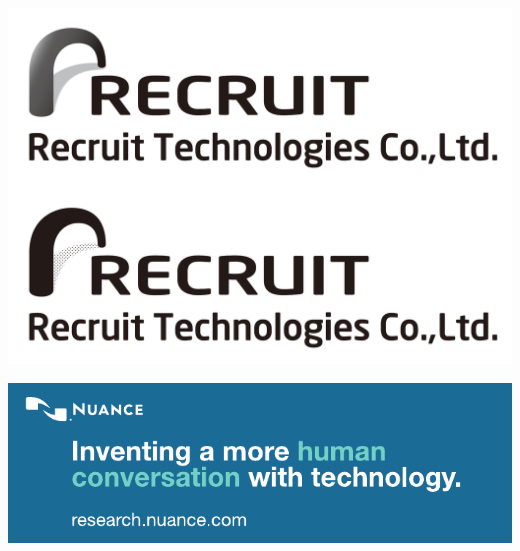 \begin{center}
\includegraphics[width=1\textwidth]{content/images/ads/recruit}
\par\end{center}

\vfill{}


\begin{center}
\includegraphics[width=1\textwidth]{content/images/ads/nuance}
\par\end{center}

\clearpage{}

